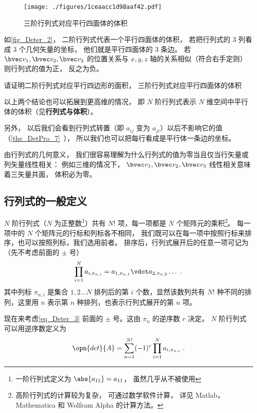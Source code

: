 \begin{figure}[ht]
\centering
\texttt{[image: ./figures/1ceaacc1d98aaf42.pdf]}
\caption{三阶行列式对应平行四面体的体积} \label{fig_Deter_2}
\end{figure}
如\autoref{fig_Deter_2}， 二阶行列式代表一个平行四面体的体积， 若把行列式的 3 列看成 3 个几何矢量的坐标， 他们就是平行四面体的 3 条边。 若 $\bvec v_1, \bvec v_2, \bvec v_3$ 的位置关系与 $x, y, z$ 轴的关系相似（符合右手定则） 则行列式的值为正， 反之为负。

\begin{exercise}{}
请证明二阶行列式对应平行四边形的面积， 三阶行列式对应平行四面体的体积
\end{exercise}

以上两个结论也可以拓展到更高维的情况， 即 $N$ 阶行列式表示 $N$ 维空间中平行体的体积（见\textbf{行列式与体积}）。

另外， 以后我们会看到行列式转置（即 $a_{ij}$ 变为 $a_{ji}$）以后不影响它的值（\autoref{the_DetPro_7}~）， 所以我们也可以把每行看成是平行体一条边的坐标。

由行列式的几何意义， 我们很容易理解为什么行列式的值为零当且仅当行矢量或列矢量线性相关： 例如三维的情况下， $\bvec v_1, \bvec v_2, \bvec v_3$ 线性相关意味着三矢量共面， 体积必为零。

\subsection{行列式的一般定义}


$N$ 阶行列式（$N$ 为正整数\footnote{一阶行列式定义为 $\abs{a_{11}}=a_{11}$， 虽然几乎从不被使用}）共有 $N!$ 项，每一项都是 $N$ 个矩阵元的乘积\footnote{高阶行列式的计算较为复杂， 可通过数学软件计算， 详见 Matlab，Mathematica 和 Wolfram Alpha 的计算方法。%
}。 每一项中的 $N$ 个矩阵元的行标和列标各不相同， 我们既可以在每一项中按照行标来排序，也可以按照列标，我们选用前者。 排序后，行列式展开后的任意一项可记为（先不考虑前面的 $\pm$ 号）
\begin{equation}\label{eq_Deter_3}
\prod_{i=1}^N a_{i,\pi_{n,i}} = 
a_{1,\pi_{n,1}} \vdot a_{2,\pi_{n,2}} \dots~.
\end{equation}
其中列标 $\pi_{n,i}$ 是集合 ${1,2 \dots N}$ 排列后的第 $i$ 个数，显然该数列共有 $N!$ 种不同的排列，这里用 $n$ 表示第 $n$ 种排列，也表示行列式展开的第 $n$ 项。

现在来考虑\autoref{eq_Deter_3} 前面的 $\pm$ 号。这由 $\pi_n$ 的逆序数 $r$ 决定。 $N$ 阶行列式可以用逆序数定义为
\begin{equation}\label{eq_Deter_4}
\opn{det}{A} = \sum_{n=1}^{N!} (-1)^{r} \prod_{i=1}^N a_{i,\pi_{n,i}}~.
\end{equation}

